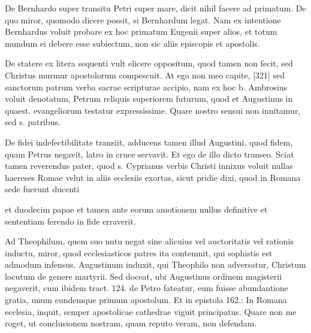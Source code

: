 De Bernhardo super transitu Petri super mare, dicit nihil facere ad primatum. De quo miror, quomodo dicere possit, si Bernhardum legat. Nam ex intentione Bernhardus voluit probare ex hoc primatum Eugenii super alios, et totum mundum ei debere esse subiectum, non sic aliis episcopis et apostolis.

De statere ex litera sequenti vult elicere oppositum, quod tamen non fecit, sed Christus murmur apostolorum compescuit. At ego non meo capite, [321] sed sanctorum patrum verba sacrae scripturae accipio, nam ex hoc b. Ambrosius voluit denotatum, Petrum reliquis superiorem futurum, quod et Augustinus in quaest. evangeliorum testatur expressissime. Quare nostro sensui non innitamur, sed s. patribus.

De fidei indefectibilitate transiit, adducens tamen illud Augustini, quod fidem, quam Petrus negavit, latro in cruce servavit. Et ego de illo dicto transeo. Sciat tamen reverendus pater, quod s. Cyprianus verbis Christi innixus voluit nullas haereses Romae velut in aliis ecclesiis exortas, sicut pridie dixi, quod in Romana sede fuerunt ducenti

et duodecim papae et tamen ante eorum amotionem nullus definitive et sententiam ferendo in fide erraverit.

Ad Theophilum, quem suo nutu negat sine alicuius vel auctoritatis vel rationis inductu, miror, quod ecclesiasticos patres ita contemnit, qui sophistis est admodum infensus. Augustinum induxit, qui Theophilo non adversatur, Christum locutum de genere martyrii. Sed doceat, ubi Augustinus ordinem magisterii negaverit, cum ibidem tract. 124. de Petro fateatur, eum fuisse abundantione gratia, unum eundemque primum apostolum. Et in epistola 162.: In Romana ecclesia, inquit, semper apostolicae cathedrae viguit principatus. Quare non me roget, ut conclusionem nostram, quam reputo veram, non defendam.

